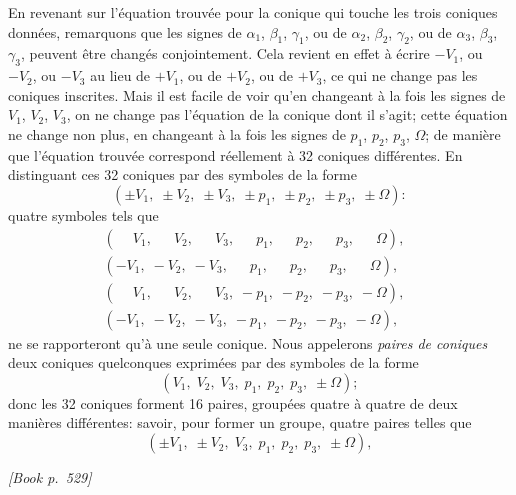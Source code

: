 \documentclass[11pt]{article}
\begin{document}
En revenant sur l'\'equation trouv\'ee pour la conique qui touche les trois coniques donn\'ees, remarquons que les signes de $\alpha_{1}$, $\beta_{1}$, $\gamma_{1}$, ou de $\alpha_{2}$, $\beta_{2}$, $\gamma_{2}$, ou de $\alpha_{3}$, $\beta_{3}$, $\gamma_{3}$, peuvent \^etre chang\'es conjointement. Cela revient en effet \`a \'ecrire $-V_{1}$, ou $-V_{2}$, ou $-V_{3}$ au lieu de $+V_{1}$, ou de $+V_{2}$, ou de $+V_{3}$, ce qui ne change pas les coniques inscrites. Mais il est facile de voir qu'en changeant \`a la fois les signes de $V_{1}$, $V_{2}$, $V_{3}$, on ne change pas l'\'equation de la conique dont il s'agit; cette \'equation ne change non plus, en changeant \`a la fois les signes de $p_{1}$, $p_{2}$, $p_{3}$, $\Omega$; de mani\`ere que l'\'equation trouv\'ee correspond r\'eellement \`a 32 coniques diff\'erentes. En distinguant ces 32 coniques par des symboles de la forme
\[
(\pm V_{1},\;\pm V_{2},\;\pm V_{3},\;\pm p_{1},\;\pm p_{2},\;\pm p_{3},\;\pm \Omega):
\]
quatre symboles tels que
\[
\begin{aligned}
(\phantom{-}V_{1},\;\phantom{-}V_{2},\;\phantom{-}V_{3},\;\phantom{-}p_{1},\;\phantom{-}p_{2},\;\phantom{-}p_{3},\;\phantom{-}\Omega),&\\
(-V_{1},\;-V_{2},\;-V_{3},\;\phantom{-}p_{1},\;\phantom{-}p_{2},\;\phantom{-}p_{3},\;\phantom{-}\Omega),&\\
(\phantom{-}V_{1},\;\phantom{-}V_{2},\;\phantom{-}V_{3},\;-p_{1},\;-p_{2},\;-p_{3},\;-\Omega),&\\
(-V_{1},\;-V_{2},\;-V_{3},\;-p_{1},\;-p_{2},\;-p_{3},\;-\Omega),&
\end{aligned}
\]
ne se rapporteront qu'\`a une seule conique. Nous appelerons \emph{paires de coniques} deux coniques quelconques exprim\'ees par des symboles de la forme
\[
(V_{1},\;V_{2},\;V_{3},\;p_{1},\;p_{2},\;p_{3},\;\pm\Omega);
\]
donc les 32 coniques forment 16 paires, group\'ees quatre \`a quatre de deux mani\`eres diff\'erentes: savoir, pour former un groupe, quatre paires telles que
\[
(\pm V_{1},\;\pm V_{2},\;V_{3},\;p_{1},\;p_{2},\;p_{3},\;\pm\Omega),
\]

\medskip
\noindent\textit{[Book p.~529]}\hfill

\smallskip
\end{document}
